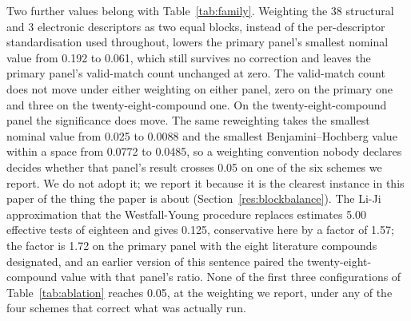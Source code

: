 \documentclass[11pt,a4paper]{article}
\begin{document}
Two further values belong with Table~\ref{tab:family}. Weighting the 38
structural and 3 electronic descriptors as two equal blocks, instead of the
per-descriptor standardisation used throughout, lowers the primary panel's
smallest nominal value from 0.192 to 0.061, which still survives no correction
and leaves the primary panel's valid-match count unchanged at zero. The
valid-match count does not move under either weighting on either panel, zero on
the primary one and three on the twenty-eight-compound one. On the
twenty-eight-compound panel the significance does move. The same reweighting
takes the smallest nominal value from 0.025 to 0.0088 and the smallest
Benjamini--Hochberg value within a space from 0.0772 to 0.0485, so a weighting
convention nobody declares decides whether that panel's result crosses 0.05 on
one of the six schemes we report. We do not adopt it; we report it because it
is the clearest instance in this paper of the thing the paper is about
(Section~\ref{res:blockbalance}).
The Li-Ji approximation that the Westfall-Young procedure replaces estimates
5.00 effective tests of eighteen and gives 0.125, conservative here by a factor
of 1.57; the factor is 1.72 on the primary panel with the eight literature
compounds designated, and an earlier version of this sentence paired the
twenty-eight-compound value with that panel's ratio. None of the first three configurations of Table~\ref{tab:ablation}
reaches 0.05, at the weighting we report, under any of the four schemes that
correct what was actually run.

\begin{table}[!htb]
\centering
\caption{Six ways of accounting for the search, applied to the eighteen tests
of each panel configuration. The Westfall-Young min-$P$ value
\cite{westfall1993} is exact for the dependence among the tests, since all
eighteen share one enumeration of designations; $m_{\mathrm{eff}}$ approximates
that dependence from the eigenvalues of the correlation matrix of the eighteen
nulls \cite{liji2005}, used as a Bonferroni divisor. The schemes do not control the same quantity and their
values are therefore not comparable row to row: the Benjamini--Hochberg rows
control a false discovery rate, while Westfall--Young min-$P$ and the
Bonferroni divisor control a family-wise error rate, and the
$m_{\mathrm{eff}}$ row is a count rather than a $p$-value. On the primary
panel no scheme returns anything below 0.05 and on the smaller panel only the
pre-specified-statistic scheme does, while the fourth configuration, which
differs from the second by two class labels, is below 0.05 under every scheme.}
\label{tab:family}
\small
\setlength{\tabcolsep}{4pt}

\end{table}
\end{document}

